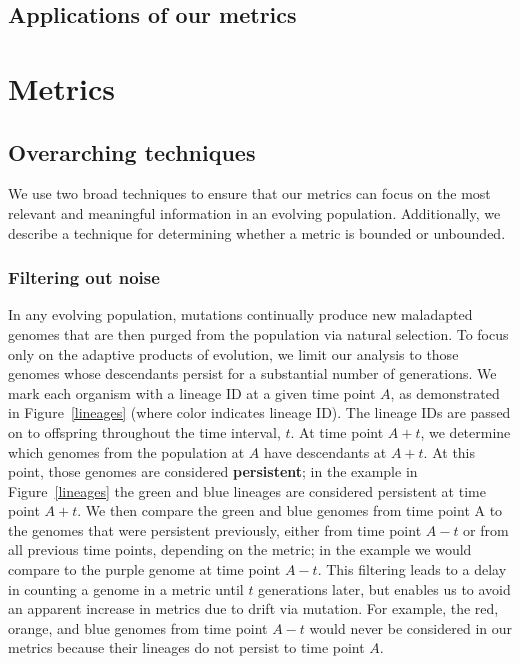 \documentclass[letterpaper]{article}
\begin{document}
\subsection{Applications of our metrics}



\section{Metrics}



\subsection{Overarching techniques}

We use two broad techniques to ensure that our metrics can focus on the most relevant and meaningful information in an evolving population. Additionally, we describe a technique for determining whether a metric is bounded or unbounded.

\subsubsection{Filtering out noise}

In any evolving population, mutations continually produce new maladapted genomes that are then purged from the population via natural selection. To focus only on the adaptive products of evolution, we limit our analysis to those genomes whose descendants persist for a substantial number of generations. We mark each organism with a lineage ID at a given time point $A$, as demonstrated in Figure~\ref{lineages} (where color indicates lineage ID). The lineage IDs are passed on to offspring throughout the time interval, $t$. At time point $A+t$, we determine which genomes from the population at $A$ have descendants at $A+t$. At this point, those genomes are considered \textbf{persistent}; in the example in Figure~\ref{lineages} the green and blue lineages are considered persistent at time point $A+t$. We then compare the green and blue genomes from time point A to the genomes that were persistent previously, either from time point $A-t$ or from all previous time points, depending on the metric; in the example we would compare to the purple genome at time point $A-t$. This filtering leads to a delay in counting a genome in a metric until $t$ generations later, but enables us to avoid an apparent increase in metrics due to drift via mutation. For example, the red, orange, and blue genomes from time point $A-t$ would never be considered in our metrics because their lineages do not persist to time point $A$.
    
\end{document}
